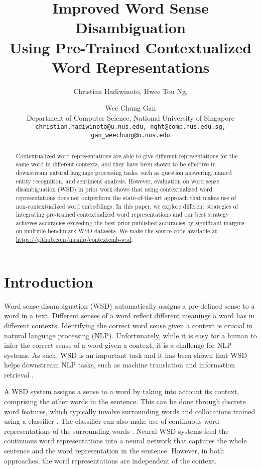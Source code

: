 \documentclass[11pt,a4paper]{article}
\title{Improved Word Sense Disambiguation \\ Using Pre-Trained Contextualized Word Representations}
\author{Christian Hadiwinoto, Hwee Tou Ng, \and Wee Chung Gan \\
  Department of Computer Science, National University of Singapore \\
  {\tt christian.hadiwinoto@u.nus.edu, nght@comp.nus.edu.sg,} \\
  {\tt gan\_weechung@u.nus.edu} \\}
\date{}
\begin{document}
\maketitle
\begin{abstract}
Contextualized word representations are able to give different representations for the same word in different contexts, and they have been shown to be effective in downstream natural language processing tasks, such as question answering, named entity recognition, and sentiment analysis. However, evaluation on word sense disambiguation (WSD) in prior work shows that using contextualized word representations does not outperform the state-of-the-art approach that makes use of non-contextualized word embeddings. In this paper, we explore different strategies of integrating pre-trained contextualized word representations and our best strategy achieves accuracies exceeding the best prior published accuracies by significant margins on multiple benchmark WSD datasets. We make the source code available at \url{https://github.com/nusnlp/contextemb-wsd}.
\end{abstract}

\section{Introduction}
\label{sec:intro}

Word sense disambiguation (WSD) automatically assigns a pre-defined sense to a word in a text. Different senses of a word reflect different meanings a word has in different contexts. Identifying the correct word sense given a context is crucial in natural language processing (NLP). Unfortunately, while it is easy for a human to infer the correct sense of a word given a context, it is a challenge for NLP systems. As such, WSD is an important task and it has been shown that WSD helps downstream NLP tasks, such as machine translation \cite{chan_word_2007} and information retrieval \cite{zhong_word_2012}.

A WSD system assigns a sense to a word by taking into account its context, comprising the other words in the sentence. This can be done through discrete word features, which typically involve surrounding words and collocations trained using a classifier \cite{lee_supervised_2004,ando_applying_2006,chan_nus-pt:_2007,zhong_it_2010}. The classifier can also make use of continuous word representations of the surrounding words \cite{taghipour_semi-supervised_2015,iacobacci_embeddings_2016}. Neural WSD systems \cite{kageback_word_2016,raganato_neural_2017} feed the continuous word representations into a neural network that captures the whole sentence and the word representation in the sentence. However, in both approaches, the word representations are independent of the context.
\end{document}
